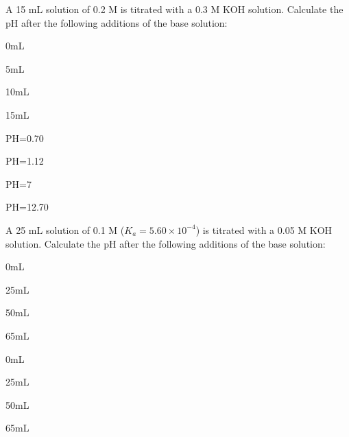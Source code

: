 \documentclass[main.tex]{subfiles}
\begin{document}
\begin{multicols*}{2}
\begin{question}[ID=\the\value{numA}]
A 15 mL solution of 0.2 M  is titrated with a 0.3 M KOH solution. Calculate the pH after the following additions of the base solution: 
\begin{inparaenum}[(a)]
\item  0mL  	%
\item  5mL		%
\item  10mL	%
\item  15mL	%
 \end{inparaenum}
\end{question}
\begin{solution}
\begin{inparaenum}[(a)]
 \item  PH=0.70
\item   PH=1.12
\item   PH=7
\item   PH=12.70
 \end{inparaenum}
\hspace{0.1cm}\end{solution}%



\begin{question}[ID=\the\value{numA}]
A 25 mL solution of 0.1 M  ($K_a=5.60 \times 10^{-4}$) is titrated with a 0.05 M KOH solution. Calculate the pH after the following additions of the base solution: 
\begin{inparaenum}[(a)]
\item  0mL  	%
\item  25mL	%
\item  50mL	%
\item  65mL	%
 \end{inparaenum}
\end{question}
\begin{solution}
\begin{inparaenum}[(a)]
\item  0mL  	%
\item  25mL	%
\item  50mL	%
\item  65mL	%
 \end{inparaenum}
\hspace{0.1cm}\end{solution}%


\end{multicols*}
\end{document}
